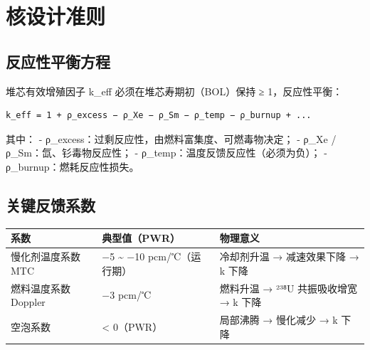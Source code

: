 \documentclass[
  UTF8,
  scheme=plain,
  fontsize=10pt,
  openany
]{ctexbook}
\begin{document}
\section{核设计准则}\label{ux6838ux8bbeux8ba1ux51c6ux5219}

\subsection{反应性平衡方程}\label{ux53cdux5e94ux6027ux5e73ux8861ux65b9ux7a0b}

堆芯有效增殖因子 k\_eff 必须在堆芯寿期初（BOL）保持 ≥ 1，反应性平衡：

\begin{verbatim}k_eff = 1 + ρ_excess − ρ_Xe − ρ_Sm − ρ_temp − ρ_burnup + ...\end{verbatim}

其中： - ρ\_excess：过剩反应性，由燃料富集度、可燃毒物决定； - ρ\_Xe /
ρ\_Sm：氙、钐毒物反应性； - ρ\_temp：温度反馈反应性（必须为负）； -
ρ\_burnup：燃耗反应性损失。

\subsection{关键反馈系数}\label{ux5173ux952eux53cdux9988ux7cfbux6570}

{\def\LTcaptype{none} %
\begin{longtable}[]{@{}
  >{\raggedright\arraybackslash}p{}
  >{\raggedright\arraybackslash}p{}
  >{\raggedright\arraybackslash}p{}@{}}
\toprule\noalign{}
\begin{minipage}[b]{\linewidth}\raggedright
系数
\end{minipage} & \begin{minipage}[b]{\linewidth}\raggedright
典型值（PWR）
\end{minipage} & \begin{minipage}[b]{\linewidth}\raggedright
物理意义
\end{minipage} \\
\midrule\noalign{}
\endhead
\bottomrule\noalign{}
\endlastfoot
慢化剂温度系数 MTC & −5 \textasciitilde{} −10 pcm/℃（运行期） &
冷却剂升温 → 减速效果下降 → k 下降 \\
燃料温度系数 Doppler & −3 pcm/℃ & 燃料升温 → ²³⁸U 共振吸收增宽 → k
下降 \\
空泡系数 & \textless{} 0（PWR） & 局部沸腾 → 慢化减少 → k 下降 \\
\end{longtable}
}
\end{document}
